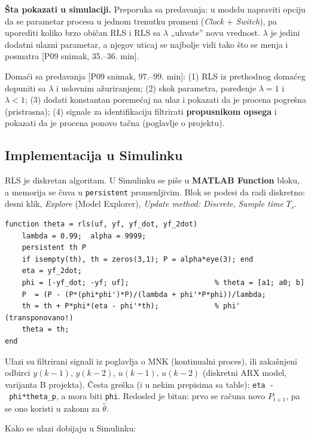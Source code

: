 \documentclass[11pt,a4paper,parskip=half,headsepline,numbers=noenddot]{scrartcl}
\DeclareRobustCommand{\izvor}[1]{{\small\color{izvorC}[#1]}}
\begin{document}
\textbf{Šta pokazati u simulaciji.} Preporuka sa predavanja: u modelu napraviti opciju da se parametar procesa u jednom trenutku promeni (\emph{Clock} + \emph{Switch}), pa uporediti koliko brzo običan RLS i RLS sa \(\lambda\) „uhvate'' novu vrednost. \(\lambda\) je jedini dodatni ulazni parametar, a njegov uticaj se najbolje vidi tako što se menja i posmatra \izvor{P09 snimak, 35.--36. min}.

Domaći sa predavanja \izvor{P09 snimak, 97.--99. min}: (1) RLS iz prethodnog domaćeg dopuniti sa \(\lambda\) i uslovnim ažuriranjem; (2) skok parametra, poređenje \(\lambda = 1\) i \(\lambda < 1\); (3) dodati konstantan poremećaj na ulaz i pokazati da je procena pogrešna (pristrasna); (4) signale za identifikaciju filtrirati \textbf{propusnikom opsega} i pokazati da je procena ponovo tačna (poglavlje o projektu).

\subsection{Implementacija u Simulinku}

RLS je diskretan algoritam. U Simulinku se piše u \textbf{MATLAB Function} bloku, a memorija se čuva u \texttt{persistent} promenljivim. Blok se podesi da radi diskretno: desni klik, \emph{Explore} (Model Explorer), \emph{Update method: Discrete}, \emph{Sample time} \(T_s\).

\begin{verbatim}
function theta = rls(uf, yf, yf_dot, yf_2dot)
    lambda = 0.99;  alpha = 9999;
    persistent th P
    if isempty(th), th = zeros(3,1); P = alpha*eye(3); end
    eta = yf_2dot;
    phi = [-yf_dot; -yf; uf];                    % theta = [a1; a0; b]
    P  = (P - (P*(phi*phi')*P)/(lambda + phi'*P*phi))/lambda;
    th = th + P*phi*(eta - phi'*th);             % phi' (transponovano!)
    theta = th;
end
\end{verbatim}

Ulazi su filtrirani signali iz poglavlja o MNK (kontinualni proces), ili zakašnjeni odbirci \(y(k-1)\), \(y(k-2)\), \(u(k-1)\), \(u(k-2)\) (diskretni ARX model, varijanta B projekta). Česta greška (i u nekim prepisima sa table): \texttt{eta\ -\ phi*theta\_\allowbreak{}p}, a mora biti \texttt{phi\textquotesingle{}}. Redosled je bitan: prvo se računa novo \(P_{t+1}\), pa se ono koristi u zakonu za \(\hat\theta\).

Kako se ulazi dobijaju u Simulinku:
\end{document}
